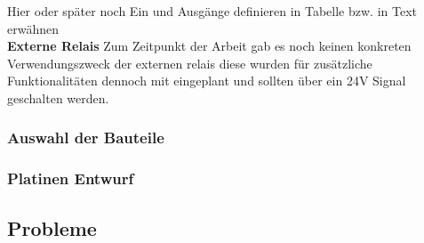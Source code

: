 \begin{table}[H]
	\centering
	\caption{Funktionen digitaler Ausgänge und analoger Eingang}
	\label{tab:digitale_Ausgaenge}
\end{table}
Hier oder später noch Ein und Ausgänge definieren in Tabelle bzw. in Text erwähnen
\\

\noindent\textbf{Externe Relais}\newline
Zum Zeitpunkt der Arbeit gab es noch keinen konkreten Verwendungszweck der externen relais diese wurden für zusätzliche Funktionalitäten dennoch mit eingeplant und sollten über ein 24V Signal geschalten werden.
\subsubsection{Auswahl der Bauteile}
\subsubsection{Platinen Entwurf}
\subsection{Probleme}